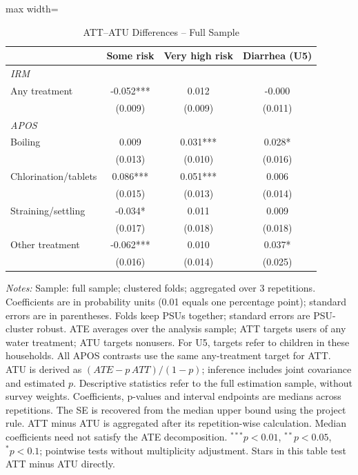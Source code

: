 \documentclass[10pt]{article}
\begin{document}
\clearpage
\begin{table}[H]
\centering
\caption{ATT--ATU Differences -- Full Sample}
\label{tab:ate-att-atu-clustered-aggregated-difference}
\scriptsize
\setlength{\tabcolsep}{4pt}
\renewcommand{\arraystretch}{0.92}
\begin{adjustbox}{max width=\linewidth}
\begin{tabular}{lccc}
\hline\hline
 & Some risk & Very high risk & Diarrhea (U5) \\
\midrule
\multicolumn{4}{l}{\textit{IRM}} \\
Any treatment & -0.052*** & 0.012 & -0.000 \\
 & (0.009) & (0.009) & (0.011) \\
\midrule
\multicolumn{4}{l}{\textit{APOS}} \\
Boiling & 0.009 & 0.031*** & 0.028* \\
 & (0.013) & (0.010) & (0.016) \\
Chlorination/tablets & 0.086*** & 0.051*** & 0.006 \\
 & (0.015) & (0.013) & (0.014) \\
Straining/settling & -0.034* & 0.011 & 0.009 \\
 & (0.017) & (0.018) & (0.018) \\
Other treatment & -0.062*** & 0.010 & 0.037* \\
 & (0.016) & (0.014) & (0.025) \\
\hline\hline
\end{tabular}
\end{adjustbox}
\par\vspace{3pt}
\begin{minipage}{\linewidth}\scriptsize \textit{Notes:} Sample: full sample; clustered folds; aggregated over 3 repetitions. Coefficients are in probability units (0.01 equals one percentage point); standard errors are in parentheses. Folds keep PSUs together; standard errors are PSU-cluster robust. ATE averages over the analysis sample; ATT targets users of any water treatment; ATU targets nonusers. For U5, targets refer to children in these households. All APOS contrasts use the same any-treatment target for ATT. ATU is derived as $(ATE-p\,ATT)/(1-p)$; inference includes joint covariance and estimated $p$. Descriptive statistics refer to the full estimation sample, without survey weights. Coefficients, p-values and interval endpoints are medians across repetitions. The SE is recovered from the median upper bound using the project rule. ATT minus ATU is aggregated after its repetition-wise calculation. Median coefficients need not satisfy the ATE decomposition. $^{***}p<0.01$, $^{**}p<0.05$, $^{*}p<0.1$; pointwise tests without multiplicity adjustment. Stars in this table test ATT minus ATU directly.\end{minipage}
\end{table}
\end{document}
